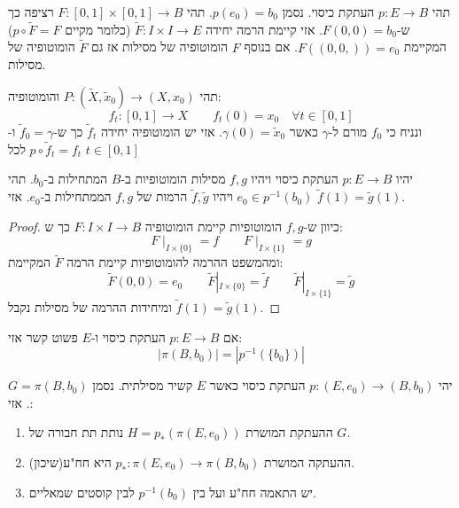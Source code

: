 \documentclass{tstextbook}
\begin{document}
\begin{theorem}
תהי \(p:E\to B\) העתקת כיסוי. נסמן \(p(e_{0})=b_{0}\). תהי \(F:[0,1]\times[0,1]\to B\) רציפה כך ש-\(F(0,0)=b_{0}\). אזי קיימת הרמה יחידה \(\tilde{F}:I\times I\to E\) (כלומר מקיים \(p\circ \tilde{F}= F\)) המקיימת \(F((0,0,))=e_{0}\). אם בנוסף \(F\) הומוטופיה של מסילות אז גם \(\tilde{F}\) הומוטופיה של מסילות.

\end{theorem}
תהי \(P:\left( \tilde{X},\tilde{x}_{0} \right)\to(X,x_{0})\) והומוטופיה:
$$f_{t}:[0,1]\to X\qquad f_{t}(0)=x_{0}\quad \forall t \in [0,1]$$
ונניח כי \(f_{0}\) מורם ל-\(\gamma\) כאשר \(\gamma(0)=\tilde{x}_{0}\). אזי יש הומוטופיה יחידה \(\tilde{f}_{t}\) כך ש-\(\tilde{f}_{0}=\gamma\) ו-\(p\circ \tilde{f}_{t}=f_{t}\) לכל \(t \in [0,1]\)

\begin{corollary}
יהיו \(p:E\to B\) העתקת כיסוי ויהיו \(f,g\) מסילות הומוטופיות ב-\(B\) המתחילות ב-\(b_{0}\). תהי \(e_{0} \in p ^{-1}(b_{0})\) ויהיו \(\tilde{f},\tilde{g}\) הרמות של \(f,g\) הממתחילות ב-\(e_{0}\). אזי \(\tilde{f}(1)=\tilde{g}(1)\). 

\end{corollary}
\begin{proof}
כיוון ש-\(f,g\) הומוטופיות קיימת הומוטופיה \(F:I\times I\to B\) כך ש:
$${ F}\mid_{I\times\{0\}}=f\qquad F\mid_{I\times\{1\}}=g$$
ומהמשפט ההרמה להומוטופיות קיימת הרמה \(\tilde{F}\) המקיימת:
$$\tilde{F}(0,0)=e_{0}\qquad \tilde{F}|_{I\times \{ 0 \}}=\tilde{f}\qquad \tilde{F}|_{I\times \{ 1 \}}=\tilde{g}$$
ומיחידות ההרמה של מסילות נקבל \(\tilde{f}(1)=\tilde{g}(1)\).

\end{proof}
\begin{proposition}
אם \(p:E\to B\) העתקת כיסוי ו-\(E\) פשוט קשר אזי:
$$\left\lvert  \pi(B,b_{0})  \right\rvert =\left\lvert  p ^{-1}\left( \{ b_{0} \} \right)  \right\rvert $$

\end{proposition}
\begin{proposition}
יהי \(p:(E,e_{0})\to (B,b_{0})\) העתקת כיסוי כאשר \(E\) קשיר מסילתית. נסמן \(G=\pi(B,b_{0})\). אזי:

  \begin{enumerate}
    \item ההעתקת המושרת \(H=p_{*}\left( \pi(E,e_{0}) \right)\) נותת תת חבורה של \(G\).  


    \item ההעתקה המושרת \(p_{*}:\pi(E,e_{0})\to \pi(B,b_{0})\) היא חח"ע(שיכון). 


    \item יש התאמה חח"ע ועל בין \(p ^{-1}(b_{0})\) לבין קוסטים שמאליים. 


  \end{enumerate}
\end{proposition}
\end{document}
